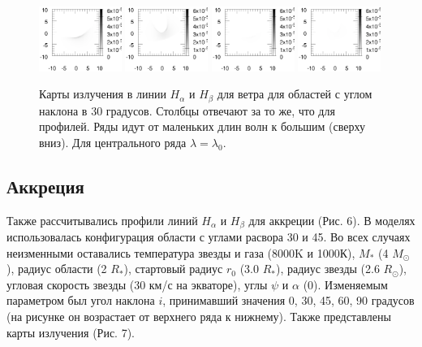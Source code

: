 \documentclass{article}
\begin{document}
\begin{figure}
	\includegraphics[width=0.24\textwidth]{map2Ha3wind306090}
	\includegraphics[width=0.24\textwidth]{map2Ha3wind303060}
	\includegraphics[width=0.24\textwidth]{map2Hb3wind306090}
	\includegraphics[width=0.24\textwidth]{map2Hb3wind303060}
	
	\caption{Карты излучения в линии $H_\alpha$ и $H_\beta$ для ветра для областей с углом наклона в 30 градусов. Столбцы отвечают за то же, что для профилей. Ряды идут от маленьких длин волн к большим (сверху вниз). Для центрального ряда $\lambda=\lambda_0$.}
	
\end{figure}
	
\subsection{Аккреция}

Также рассчитывались профили линий $H_\alpha$ и $H_\beta$ для аккреции (Рис. 6). В моделях использовалась конфигурация области с углами расвора 30 и 45. Во всех случаях неизменными оставались температура звезды и газа (8000K и 1000К), $M_\ast$ (4 $M_\odot$), радиус области (2 $R_\ast$), стартовый радиус $r_0$ (3.0 $R_\ast$), радиус звезды (2.6 $R_\odot$), угловая скорость звезды (30 км/с на экваторе), углы $\psi$ и $\alpha$ (0). Изменяемым параметром был угол наклона $i$, принимавший значения 0, 30, 45, 60, 90 градусов (на рисунке он возрастает от верхнего ряда к нижнему). Также представлены карты излучения (Рис. 7).  
\end{document}
